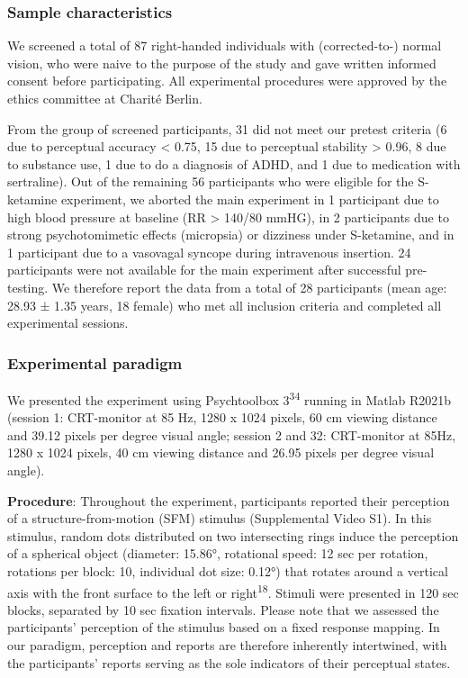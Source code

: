 \documentclass[
]{article}
\begin{document}
\subsubsection{Sample characteristics}\label{sample-characteristics}

We screened a total of 87 right-handed individuals with (corrected-to-)
normal vision, who were naive to the purpose of the study and gave
written informed consent before participating. All experimental
procedures were approved by the ethics committee at Charité Berlin.

From the group of screened participants, 31 did not meet our pretest
criteria (6 due to perceptual accuracy \textless{} 0.75, 15 due to
perceptual stability \textgreater{} 0.96, 8 due to substance use, 1 due
to do a diagnosis of ADHD, and 1 due to medication with sertraline). Out
of the remaining 56 participants who were eligible for the S-ketamine
experiment, we aborted the main experiment in 1 participant due to high
blood pressure at baseline (RR \textgreater{} 140/80 mmHG), in 2
participants due to strong psychotomimetic effects (micropsia) or
dizziness under S-ketamine, and in 1 participant due to a vasovagal
syncope during intravenous insertion. 24 participants were not available
for the main experiment after successful pre-testing. We therefore
report the data from a total of 28 participants (mean age: 28.93 ± 1.35
years, 18 female) who met all inclusion criteria and completed all
experimental sessions.

\subsubsection{Experimental paradigm}\label{experimental-paradigm}

We presented the experiment using Psychtoolbox 3\textsuperscript{34}
running in Matlab R2021b (session 1: CRT-monitor at 85 Hz, 1280 x 1024
pixels, 60 cm viewing distance and 39.12 pixels per degree visual angle;
session 2 and 32: CRT-monitor at 85Hz, 1280 x 1024 pixels, 40 cm viewing
distance and 26.95 pixels per degree visual angle).

\textbf{Procedure}: Throughout the experiment, participants reported
their perception of a structure-from-motion (SFM) stimulus (Supplemental
Video S1). In this stimulus, random dots distributed on two intersecting
rings induce the perception of a spherical object (diameter: 15.86°,
rotational speed: 12 sec per rotation, rotations per block: 10,
individual dot size: 0.12°) that rotates around a vertical axis with the
front surface to the left or right\textsuperscript{18}. Stimuli were
presented in 120 sec blocks, separated by 10 sec fixation intervals.
Please note that we assessed the participants' perception of the
stimulus based on a fixed response mapping. In our paradigm, perception
and reports are therefore inherently intertwined, with the participants'
reports serving as the sole indicators of their perceptual states.
\end{document}
